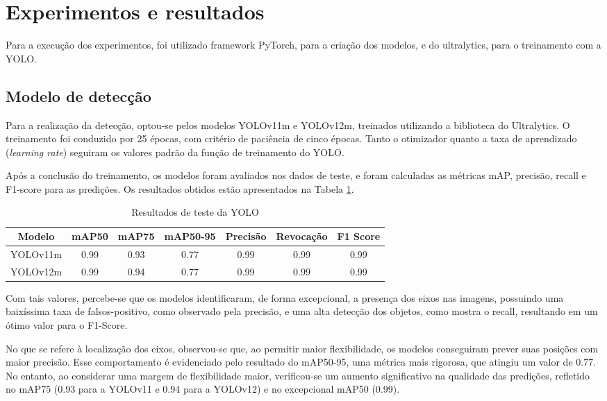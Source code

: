 \section{Experimentos e resultados}
    Para a execução dos experimentos, foi utilizado framework PyTorch, para a criação dos modelos, e do ultralytics, para o treinamento com a YOLO.
    
    \subsection{Modelo de detecção}
        Para a realização da detecção, optou-se pelos modelos YOLOv11m e YOLOv12m, treinados utilizando a biblioteca do Ultralytics. O treinamento foi conduzido por 25 épocas, com critério de paciência de cinco épocas. Tanto o otimizador quanto a taxa de aprendizado (\textit{learning rate}) seguiram os valores padrão da função de treinamento do YOLO.

        Após a conclusão do treinamento, os modelos foram avaliados nos dados de teste, e foram calculadas as métricas mAP, precisão, recall e F1-score para as predições. Os resultados obtidos estão apresentados na Tabela \ref{tab:yolo_results}.

        \begin{table}[!htb]
            \centering
            \begin{tabular}{| c | c | c | c | c | c | c | }
                 \hline
                 Modelo & mAP50 & mAP75 & mAP50-95  & Precisão & Revocação & F1 Score\\
                 \hline
                 YOLOv11m & 0.99  &  0.93 &  0.77     &   0.99    &  0.99  &  0.99\\
                 \hline
                 YOLOv12m & 0.99 & 0.94 & 0.77 & 0.99 & 0.99 & 0.99 \\
                 \hline
            \end{tabular}
            \caption{Resultados de teste da YOLO}
            \label{tab:yolo_results}
        \end{table}

        Com tais valores, percebe-se que os modelos identificaram, de forma excepcional, a presença dos eixos nas imagens, possuindo uma baixíssima taxa de falsos-positivo, como observado pela precisão, e uma alta detecção dos objetos, como mostra o recall, resultando em um ótimo valor para o F1-Score.

        No que se refere à localização dos eixos, observou-se que, ao permitir maior flexibilidade, os modelos conseguiram prever suas posições com maior precisão. Esse comportamento é evidenciado pelo resultado do mAP50-95, uma métrica mais rigorosa, que atingiu um valor de 0.77. No entanto, ao considerar uma margem de flexibilidade maior, verificou-se um aumento significativo na qualidade das predições, refletido no mAP75 (0.93 para a YOLOv11 e 0.94 para a YOLOv12) e no excepcional mAP50 (0.99).

